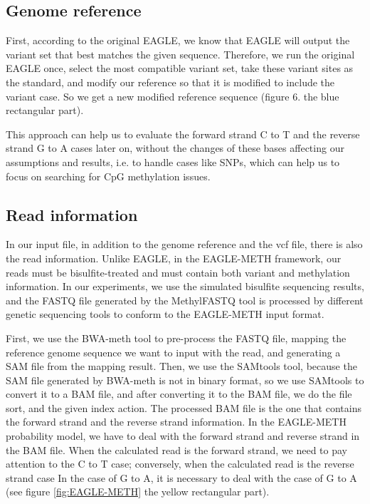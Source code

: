 \documentclass{PHlab-thesis}
\begin{document}
\subsection{Genome reference}
First, according to the original EAGLE, we know that EAGLE will output the variant set that best matches the given sequence. Therefore, we run the original EAGLE once, select the most compatible variant set, take these variant sites as the standard, and modify our reference so that it is modified to include the variant case. So we get a new modified reference sequence (figure 6. the blue rectangular part).
\par This approach can help us to evaluate the forward strand C to T and the reverse strand G to A cases later on, without the changes of these bases affecting our assumptions and results, i.e. to handle cases like SNPs, which can help us to focus on searching for CpG methylation issues.
\subsection{Read information}
In our input file, in addition to the genome reference and the vcf file, there is also the read information. Unlike EAGLE, in the EAGLE-METH framework, our reads must be bisulfite-treated and must contain both variant and methylation information. In our experiments, we use the simulated bisulfite sequencing results, and the FASTQ file generated by the MethylFASTQ tool is processed by different genetic sequencing tools to conform to the EAGLE-METH input format.
\par First, we use the BWA-meth tool to pre-process the FASTQ file, mapping the reference genome sequence we want to input with the read, and generating a SAM file from the mapping result. Then, we use the SAMtools tool, because the SAM file generated by BWA-meth is not in binary format, so we use SAMtools to convert it to a BAM file, and after converting it to the BAM file, we do the file sort, and the given index action. The processed BAM file is the one that contains the forward strand and the reverse strand information. In the EAGLE-METH probability model, we have to deal with the forward strand and reverse strand in the BAM file. When the calculated read is the forward strand, we need to pay attention to the C to T case; conversely, when the calculated read is the reverse strand case In the case of G to A, it is necessary to deal with the case of G to A (see figure \ref{fig:EAGLE-METH} the yellow rectangular part).
\end{document}
